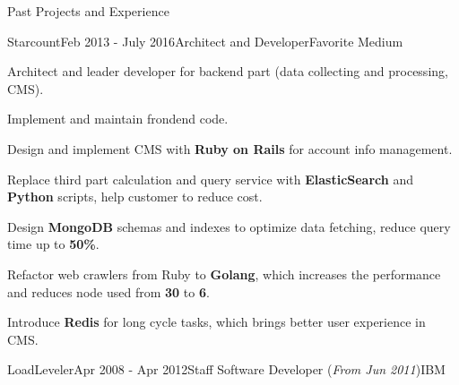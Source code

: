 \documentclass{resume} %
\newcommand{\http}{http:/\hspace{-0.3ex}/}
\begin{document}
\begin{rSection}{Past Projects and Experience}
\begin{rSubsection}{Starcount}{Feb 2013 - July 2016}{Architect and Developer}{Favorite Medium}
\begin{rSubsectionList}
\item Architect and leader developer for backend part (data collecting and processing, CMS).
\item Implement and maintain frondend code.
\item Design and implement CMS with \textbf{Ruby on Rails} for account info management.
\item Replace third part calculation and query service with \textbf{ElasticSearch} and \textbf{Python} scripts, help customer to reduce cost.
\item Design \textbf{MongoDB} schemas and indexes to optimize data fetching, reduce query time up to \textbf{50\%}.
\item Refactor web crawlers from Ruby to \textbf{Golang}, which increases the performance and reduces node used from \textbf{30} to \textbf{6}.
\item Introduce \textbf{Redis} for long cycle tasks, which brings better user experience in CMS.
\end{rSubsectionList}
\end{rSubsection}


%
%



\begin{rSubsection}{LoadLeveler}{Apr 2008 - Apr 2012}{Staff Software Developer (\textit{From Jun 2011})}{IBM}


\end{rSubsection}
\end{rSection}
\end{document}
